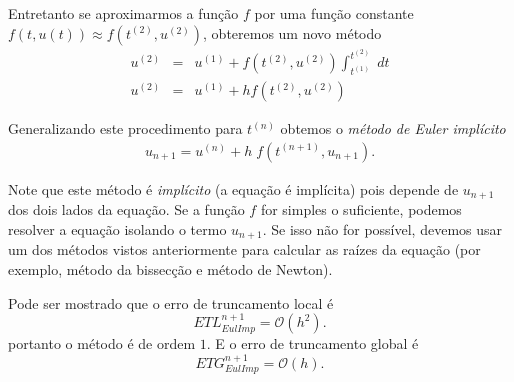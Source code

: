 Entretanto se aproximarmos a função $f$ por uma função constante $f(t,u(t)) \approx  f(t^{(2)},u^{(2)})$, obteremos um novo método
\begin{eqnarray}
  u^{(2)} &=&  u^{(1)} + f(t^{(2)},u^{(2)}) \int _{t^{(1)}}^{t^{(2)}}  \; dt \\
  u^{(2)} &=&  u^{(1)} + h f(t^{(2)},u^{(2)})
\end{eqnarray}


Generalizando este procedimento para $t^{(n)}$ obtemos o \emph{método de Euler implícito}
\begin{eqnarray}
u_{n+1}=u^{(n)} + h\;f(t^{(n+1)},u_{n+1}).
\end{eqnarray}

Note que este método é \emph{implícito} (a equação é implícita) pois depende de $u_{n+1}$ dos dois lados da equação. Se a função $f$ for simples o suficiente, podemos resolver a equação isolando o termo $u_{n+1}$. Se isso não for possível, devemos usar um dos métodos vistos anteriormente para calcular as raízes da equação (por exemplo, método da bissecção e método de Newton).



Pode ser mostrado que o erro de truncamento local é
$$ETL_{EulImp}^{n+1}= \mathcal{O}(h^2).$$
portanto o método é de ordem $1$. E o erro de truncamento global é
$$ETG_{EulImp}^{n+1}= \mathcal{O}(h).$$



